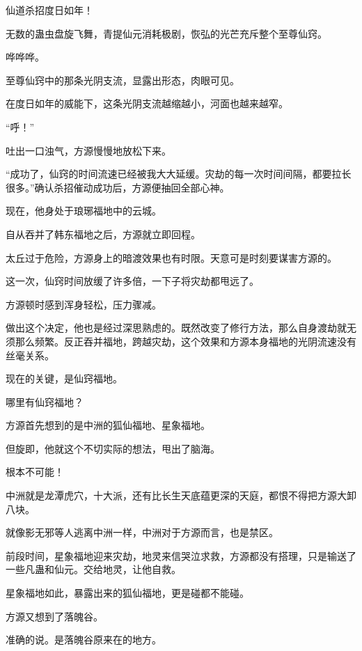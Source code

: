 
\begin{this_body}



仙道杀招度日如年！

无数的蛊虫盘旋飞舞，青提仙元消耗极剧，恢弘的光芒充斥整个至尊仙窍。

哗哗哗。

至尊仙窍中的那条光阴支流，显露出形态，肉眼可见。

在度日如年的威能下，这条光阴支流越缩越小，河面也越来越窄。

“呼！”

吐出一口浊气，方源慢慢地放松下来。

“成功了，仙窍的时间流速已经被我大大延缓。灾劫的每一次时间间隔，都要拉长很多。”确认杀招催动成功后，方源便抽回全部心神。

现在，他身处于琅琊福地中的云城。

自从吞并了韩东福地之后，方源就立即回程。

太丘过于危险，方源身上的暗渡效果也有时限。天意可是时刻要谋害方源的。

这一次，仙窍时间放缓了许多倍，一下子将灾劫都甩远了。

方源顿时感到浑身轻松，压力骤减。

做出这个决定，他也是经过深思熟虑的。既然改变了修行方法，那么自身渡劫就无须那么频繁。反正吞并福地，跨越灾劫，这个效果和方源本身福地的光阴流速没有丝毫关系。

现在的关键，是仙窍福地。

哪里有仙窍福地？

方源首先想到的是中洲的狐仙福地、星象福地。

但旋即，他就这个不切实际的想法，甩出了脑海。

根本不可能！

中洲就是龙潭虎穴，十大派，还有比长生天底蕴更深的天庭，都恨不得把方源大卸八块。

就像影无邪等人逃离中洲一样，中洲对于方源而言，也是禁区。

前段时间，星象福地迎来灾劫，地灵来信哭泣求救，方源都没有搭理，只是输送了一些凡蛊和仙元。交给地灵，让他自救。

星象福地如此，暴露出来的狐仙福地，更是碰都不能碰。

方源又想到了落魄谷。

准确的说。是落魄谷原来在的地方。


\end{this_body}
